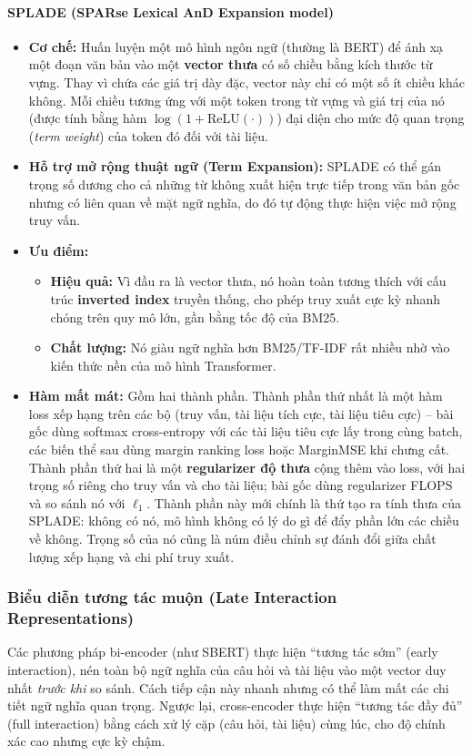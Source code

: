 \paragraph{SPLADE (SPARse Lexical AnD Expansion model)} \cite{formal2021splade}
\begin{itemize}
	\item \textbf{Cơ chế:} Huấn luyện một mô hình ngôn ngữ (thường là BERT) để ánh xạ một đoạn văn bản vào một \textbf{vector thưa} có số chiều bằng kích thước từ vựng. Thay vì chứa các giá trị dày đặc, vector này chỉ có một số ít chiều khác không. Mỗi chiều tương ứng với một token trong từ vựng và giá trị của nó (được tính bằng hàm $\log(1 + \text{ReLU}(\cdot))$) đại diện cho mức độ quan trọng (\textit{term weight}) của token đó đối với tài liệu.
	\item \textbf{Hỗ trợ mở rộng thuật ngữ (Term Expansion):} SPLADE có thể gán trọng số dương cho cả những từ không xuất hiện trực tiếp trong văn bản gốc nhưng có liên quan về mặt ngữ nghĩa, do đó tự động thực hiện việc mở rộng truy vấn.
	\item \textbf{Ưu điểm:} 
	\begin{itemize}
		\item \textbf{Hiệu quả:} Vì đầu ra là vector thưa, nó hoàn toàn tương thích với cấu trúc \textbf{inverted index} truyền thống, cho phép truy xuất cực kỳ nhanh chóng trên quy mô lớn, gần bằng tốc độ của BM25.
		\item \textbf{Chất lượng:} Nó giàu ngữ nghĩa hơn BM25/TF-IDF rất nhiều nhờ vào kiến thức nền của mô hình Transformer.
	\end{itemize}
	\item \textbf{Hàm mất mát:} Gồm hai thành phần. Thành phần thứ nhất là một hàm loss xếp hạng trên các bộ (truy vấn, tài liệu tích cực, tài liệu tiêu cực) -- bài gốc dùng softmax cross-entropy với các tài liệu tiêu cực lấy trong cùng batch, các biến thể sau dùng margin ranking loss hoặc MarginMSE khi chưng cất. Thành phần thứ hai là một \textbf{regularizer độ thưa} cộng thêm vào loss, với hai trọng số riêng cho truy vấn và cho tài liệu; bài gốc dùng regularizer FLOPS và so sánh nó với $\ell_1$. Thành phần này mới chính là thứ tạo ra tính thưa của SPLADE: không có nó, mô hình không có lý do gì để đẩy phần lớn các chiều về không. Trọng số của nó cũng là núm điều chỉnh sự đánh đổi giữa chất lượng xếp hạng và chi phí truy xuất.
\end{itemize}

\subsubsection{Biểu diễn tương tác muộn (Late Interaction Representations)}
\label{sssec:colbert}
Các phương pháp bi-encoder (như SBERT) thực hiện “tương tác sớm” (early interaction), nén toàn bộ ngữ nghĩa của câu hỏi và tài liệu vào một vector duy nhất \textit{trước khi} so sánh. Cách tiếp cận này nhanh nhưng có thể làm mất các chi tiết ngữ nghĩa quan trọng. Ngược lại, cross-encoder thực hiện “tương tác đầy đủ” (full interaction) bằng cách xử lý cặp (câu hỏi, tài liệu) cùng lúc, cho độ chính xác cao nhưng cực kỳ chậm.

